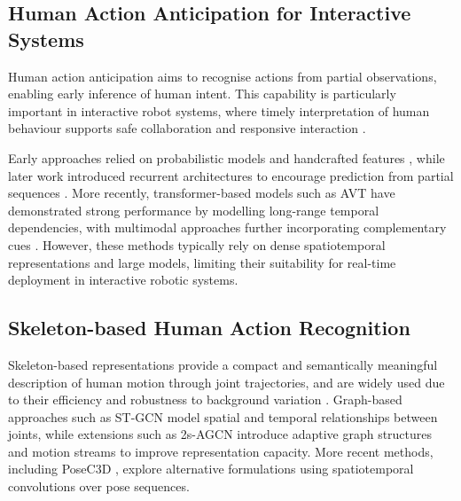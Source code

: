 \documentclass[letterpaper, 10 pt, conference]{ieeeconf}
\begin{document}
\subsection{Human Action Anticipation for Interactive Systems}

Human action anticipation aims to recognise actions from partial observations, enabling early inference of human intent. This capability is particularly important in interactive robot systems, where timely interpretation of human behaviour supports safe collaboration and responsive interaction \cite{dragan2013Legibilitypredictabilityrobotmotion,lasota2017SurveyMethodsSafeHumanRobotInteraction}.

Early approaches relied on probabilistic models and handcrafted features \cite{ryoo2011HumanactivitypredictionEarlyrecognitionongoingactivitiesstreamingvideos}, while later work introduced recurrent architectures to encourage prediction from partial sequences \cite{aliakbarian2017EncouragingLSTMsAnticipateActionsVeryEarly}. More recently, transformer-based models such as AVT \cite{girdhar2021AnticipativeVideoTransformer} have demonstrated strong performance by modelling long-range temporal dependencies, with multimodal approaches further incorporating complementary cues \cite{kong2022HumanActionRecognitionPredictionSurvey}. However, these methods typically rely on dense spatiotemporal representations and large models, limiting their suitability for real-time deployment in interactive robotic systems.

\subsection{Skeleton-based Human Action Recognition}

Skeleton-based representations provide a compact and semantically meaningful description of human motion through joint trajectories, and are widely used due to their efficiency and robustness to background variation \cite{yan2018SpatialTemporalGraphConvolutionalNetworksSkeletonBasedActionRecognition,shi2019SkeletonBasedActionRecognitionDirectedGraphNeuralNetworks}. Graph-based approaches such as ST-GCN \cite{yan2018SpatialTemporalGraphConvolutionalNetworksSkeletonBasedActionRecognition} model spatial and temporal relationships between joints, while extensions such as 2s-AGCN \cite{shi2019SkeletonBasedActionRecognitionDirectedGraphNeuralNetworks} introduce adaptive graph structures and motion streams to improve representation capacity. More recent methods, including PoseC3D \cite{duan2022RevisitingSkeletonbasedActionRecognition}, explore alternative formulations using spatiotemporal convolutions over pose sequences.
\end{document}
